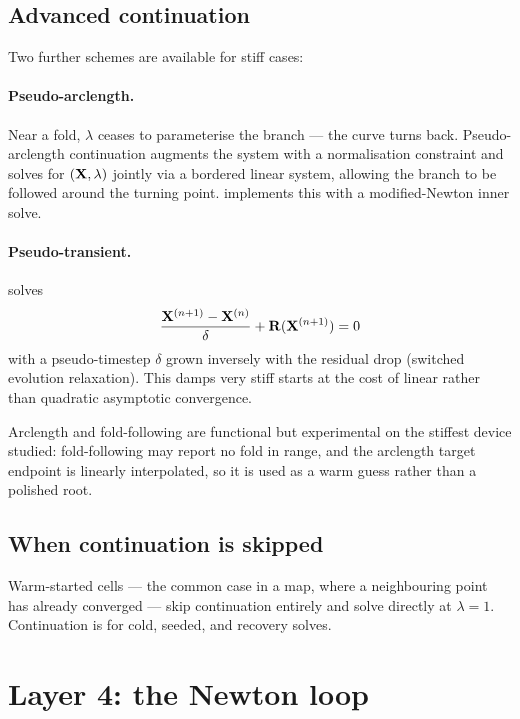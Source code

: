 \subsection{Advanced continuation}

Two further schemes are available for stiff cases:

\paragraph{Pseudo-arclength.} Near a fold, $\lambda$ ceases to parameterise the
branch --- the curve turns back. Pseudo-arclength continuation augments the
system with a normalisation constraint and solves for $(\mathbf{X},\lambda)$
jointly via a bordered linear system, allowing the branch to be followed
around the turning point.  implements this with a
modified-Newton inner solve.

\paragraph{Pseudo-transient.}  solves
\begin{equation}
  \frac{\mathbf{X}^{(n+1)} - \mathbf{X}^{(n)}}{\delta} + \mathbf{R}(\mathbf{X}^{(n+1)}) = 0
\end{equation}
with a pseudo-timestep $\delta$ grown inversely with the residual drop (switched
evolution relaxation). This damps very stiff starts at the cost of linear rather
than quadratic asymptotic convergence.

\begin{caveat}
Arclength and fold-following are functional but experimental on the stiffest
device studied: fold-following may report no fold in range, and the arclength
target endpoint is linearly interpolated, so it is used as a warm guess rather
than a polished root.
\end{caveat}

\subsection{When continuation is skipped}

Warm-started cells --- the common case in a map, where a neighbouring point has
already converged --- skip continuation entirely and solve directly at
$\lambda=1$. Continuation is for cold, seeded, and recovery solves.

\section{Layer 4: the Newton loop}

